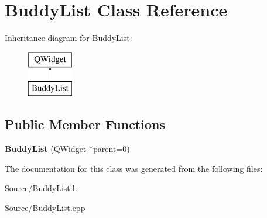 \hypertarget{class_buddy_list}{}\section{Buddy\+List Class Reference}
\label{class_buddy_list}
Inheritance diagram for Buddy\+List\+:\begin{figure}[H]
\begin{center}
\leavevmode
\includegraphics[height=2.000000cm]{class_buddy_list}
\end{center}
\end{figure}
\subsection*{Public Member Functions}
\begin{DoxyCompactItemize}
\item 
\hypertarget{class_buddy_list_a86dd65ec7cfd0b90de303bc962204195}{}{\bfseries Buddy\+List} (Q\+Widget $\ast$parent=0)\label{class_buddy_list_a86dd65ec7cfd0b90de303bc962204195}

\end{DoxyCompactItemize}


The documentation for this class was generated from the following files\+:\begin{DoxyCompactItemize}
\item 
Source/Buddy\+List.\+h\item 
Source/Buddy\+List.\+cpp\end{DoxyCompactItemize}
